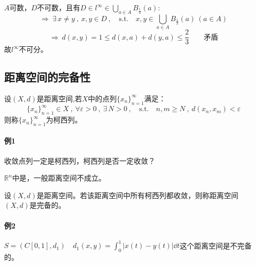 $A$可数，$D$不可数，且有$D \in l^{\infty} \in \bigcup_{a \in A}B_{\frac{1}{3}}(a)$:
\[\Rightarrow \ \exists \, x \neq y \ , \ x,y \in D \ , \quad \text{s.t.} \quad x,y \in \bigcup_{a \in A}B_{\frac{1}{3}}(a) \ (a \in A)\]
\[\Rightarrow \ d(x,y)=1 \leq d(x,a)+d(y,a) \leq \frac{2}{3} \qquad \text{矛盾}\]
故$l^{\infty}$不可分。

\subsection{距离空间的完备性}\label{complete}
\begin{definition}[柯西列]
    设$(X,d)$是距离空间,若$X$中的点列$\{x_n\}_{n=1}^{\infty}$满足：
    \[\{x_n\}_{n=1}^{\infty} \in X \ , \ \forall \varepsilon>0 \ , \ \exists \, N>0 \ , \quad \text{s.t.} \quad n,m \geq N \ , \ d(x_n,x_m)<\varepsilon\]
    则称$\{x_n\}_{n=1}^{\infty}$为柯西列。
\end{definition}

\paragraph*{例1} \quad 收敛点列一定是柯西列，柯西列是否一定收敛？

$\mathbb{R}^n$中是，一般距离空间不成立。
\begin{definition}[完备距离空间]
    设$(X,d)$是距离空间。若该距离空间中所有柯西列都收敛，则称距离空间$(X,d)$是完备的。
\end{definition}

\paragraph*{例2} \quad $S=(C[0,1],d_1) \quad d_1(x,y)=\int_0^1|x(t)-y(t)|\dd t$这个距离空间是不完备的。


